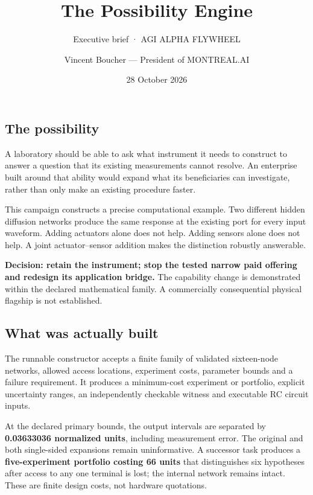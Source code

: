 \documentclass[
  10pt,
]{article}
\title{The Possibility Engine}
\subtitle{Executive brief · AGI ALPHA FLYWHEEL}
\author{Vincent Boucher --- President of MONTREAL.AI}
\date{28 October 2026}
\begin{document}
\maketitle

\hypertarget{the-possibility}{%
\subsection{The possibility}\label{the-possibility}}

A laboratory should be able to ask what instrument it needs to construct
to answer a question that its existing measurements cannot resolve. An
enterprise built around that ability would expand what its beneficiaries
can investigate, rather than only make an existing procedure faster.

This campaign constructs a precise computational example. Two different
hidden diffusion networks produce the same response at the existing port
for every input waveform. Adding actuators alone does not help. Adding
sensors alone does not help. A joint actuator--sensor addition makes the
distinction robustly answerable.

\textbf{Decision: retain the instrument; stop the tested narrow paid
offering and redesign its application bridge.} The capability change is
demonstrated within the declared mathematical family. A commercially
consequential physical flagship is not established.

\hypertarget{what-was-actually-built}{%
\subsection{What was actually built}\label{what-was-actually-built}}

The runnable constructor accepts a finite family of validated
sixteen-node networks, allowed access locations, experiment costs,
parameter bounds and a failure requirement. It produces a minimum-cost
experiment or portfolio, explicit uncertainty ranges, an independently
checkable witness and executable RC circuit inputs.

At the declared primary bounds, the output intervals are separated by
\textbf{0.03633036 normalized units}, including measurement error. The
original and both single-sided expansions remain uninformative. A
successor task produces a \textbf{five-experiment portfolio costing 66
units} that distinguishes six hypotheses after access to any one
terminal is lost; the internal network remains intact. These are finite
design costs, not hardware quotations.
\end{document}
